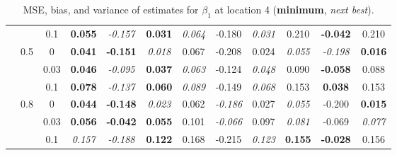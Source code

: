 \documentclass[authoryear, review, 11pt]{elsarticle}
\begin{document}
\begin{table}[ht]
\begin{center}
\begin{tabular}{ccc | ccc | ccc | ccc }
 &  & 0.1 &   \textbf{0.055} & \emph{-0.157} & \textbf{0.031} & \emph{0.064} & -0.180 & \emph{0.031} & 0.210 & \textbf{-0.042} & 0.210 \\ \cline{2-12}
 & \multirow{3}{*}{0.5} & 0 &   \textbf{0.041} & \textbf{-0.151} & \emph{0.018} & 0.067 & -0.208 & 0.024 & \emph{0.055} & \emph{-0.198} & \textbf{0.016} \\ 
 &  & 0.03 &   \textbf{0.046} & \emph{-0.095} & \textbf{0.037} & \emph{0.063} & -0.124 & \emph{0.048} & 0.090 & \textbf{-0.058} & 0.088 \\ 
 &  & 0.1 &   \textbf{0.078} & \emph{-0.137} & \textbf{0.060} & \emph{0.089} & -0.149 & \emph{0.068} & 0.153 & \textbf{0.038} & 0.153 \\ \cline{2-12}
 & \multirow{3}{*}{0.8} & 0 &   \textbf{0.044} & \textbf{-0.148} & \emph{0.023} & 0.062 & \emph{-0.186} & 0.027 & \emph{0.055} & -0.200 & \textbf{0.015} \\ 
 &  & 0.03 &   \textbf{0.056} & \textbf{-0.042} & \textbf{0.055} & 0.101 & \emph{-0.066} & 0.097 & \emph{0.081} & -0.069 & \emph{0.077} \\ 
 &  & 0.1 &   \emph{0.157} & \emph{-0.188} & \textbf{0.122} & 0.168 & -0.215 & \emph{0.123} & \textbf{0.155} & \textbf{-0.028} & 0.156 \\ 
  \end{tabular}
\caption{MSE, bias, and variance of estimates for $\beta_1$ at location 4 (\textbf{minimum}, \emph{next best}).}
\end{center}
\end{table}
\end{document}
